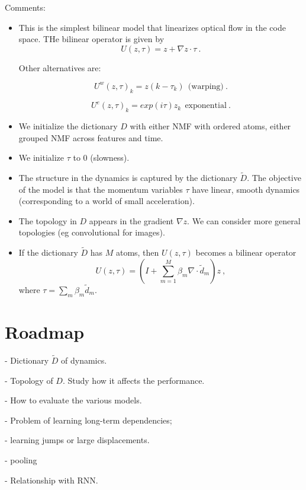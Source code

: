 \documentclass[11pt]{article} %
\begin{document}
Comments:
\begin{itemize}

\item This is the simplest bilinear model that linearizes optical flow in the code space. THe bilinear operator is given by 
$$U(z, \tau) = z + \nabla z \cdot \tau~.$$

Other alternatives are:

$$U^{w}(z, \tau)_k = z(k - \tau_k)~~\mbox{(warping)}~.$$

$$U^{e}(z, \tau)_k = exp(i \tau) z_k ~~\mbox{exponential}~.$$

\item We initialize the dictionary $D$ with either NMF with ordered atoms, either grouped NMF across features and time. 

\item We initialize $\tau$ to $0$ (slowness). 

\item The structure in the dynamics is captured by the dictionary $\widetilde{D}$. The objective of the model is that 
the momentum variables $\tau$ have linear, smooth dynamics (corresponding to a world of small acceleration).

\item The topology in $D$ appears in the gradient $\nabla z$. We can consider more general topologies (eg convolutional for images).

\item If the dictionary $\widetilde{D}$ has $M$ atoms, then $U(z,\tau)$ becomes a bilinear operator 
$$U(z,\tau) = (I + \sum_{m=1}^M \beta_m \nabla \cdot  \widetilde{d}_m ) z~,$$
where $\tau = \sum_m \beta_m \widetilde{d}_m$.

\end{itemize}

\section{Roadmap}

- Dictionary $\widetilde{D}$ of dynamics. 

- Topology of $D$. Study how it affects the performance. 

- How to evaluate the various models. 

- Problem of learning long-term dependencies; 

- learning jumps or large displacements.

- pooling

- Relationship with RNN.
\end{document}
